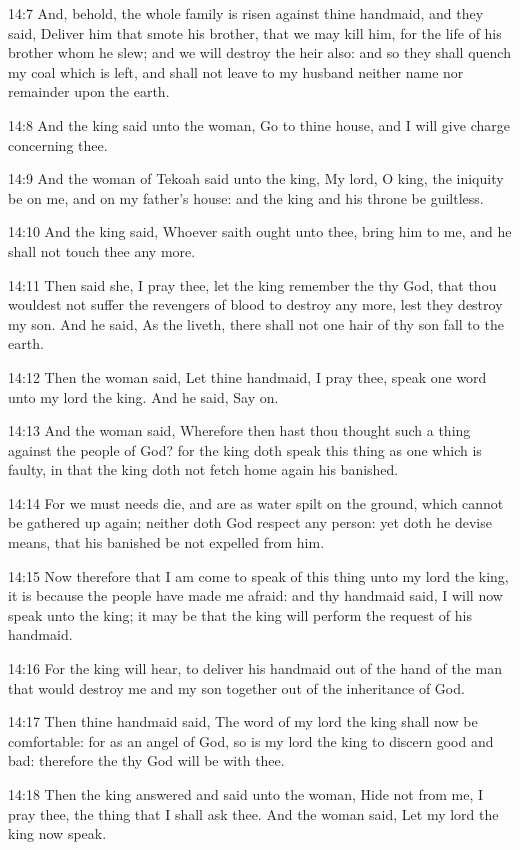 14:7 And, behold, the whole family is risen against thine handmaid,
and they said, Deliver him that smote his brother, that we may kill
him, for the life of his brother whom he slew; and we will destroy the
heir also: and so they shall quench my coal which is left, and shall
not leave to my husband neither name nor remainder upon the earth.

14:8 And the king said unto the woman, Go to thine house, and I will
give charge concerning thee.

14:9 And the woman of Tekoah said unto the king, My lord, O king, the
iniquity be on me, and on my father's house: and the king and his
throne be guiltless.

14:10 And the king said, Whoever saith ought unto thee, bring him to
me, and he shall not touch thee any more.

14:11 Then said she, I pray thee, let the king remember the \LORD thy
God, that thou wouldest not suffer the revengers of blood to destroy
any more, lest they destroy my son. And he said, As the \LORD liveth,
there shall not one hair of thy son fall to the earth.

14:12 Then the woman said, Let thine handmaid, I pray thee, speak one
word unto my lord the king. And he said, Say on.

14:13 And the woman said, Wherefore then hast thou thought such a
thing against the people of God? for the king doth speak this thing as
one which is faulty, in that the king doth not fetch home again his
banished.

14:14 For we must needs die, and are as water spilt on the ground,
which cannot be gathered up again; neither doth God respect any
person: yet doth he devise means, that his banished be not expelled
from him.

14:15 Now therefore that I am come to speak of this thing unto my lord
the king, it is because the people have made me afraid: and thy
handmaid said, I will now speak unto the king; it may be that the king
will perform the request of his handmaid.

14:16 For the king will hear, to deliver his handmaid out of the hand
of the man that would destroy me and my son together out of the
inheritance of God.

14:17 Then thine handmaid said, The word of my lord the king shall now
be comfortable: for as an angel of God, so is my lord the king to
discern good and bad: therefore the \LORD thy God will be with thee.

14:18 Then the king answered and said unto the woman, Hide not from
me, I pray thee, the thing that I shall ask thee. And the woman said,
Let my lord the king now speak.

